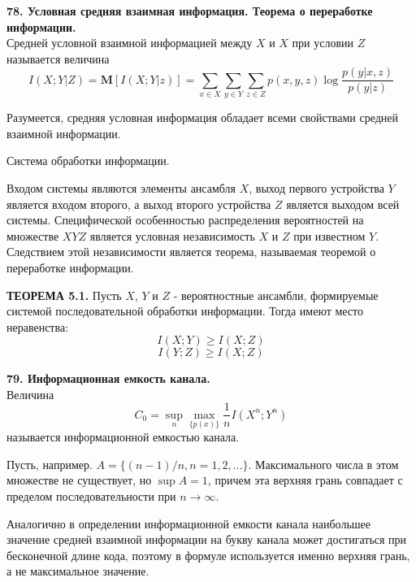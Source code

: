 \documentclass[14pt]{article}
\begin{document}
\bigskip
\textbf{78. Условная средняя взаимная информация. Теорема о переработке информации.} \\

Средней условной взаимной информацией между \(X\) и \(X\) при условии
\(Z\) называется величина
\begin{displaymath}
    I(X;Y|Z) = \textbf{M}[I(X;Y|z)] = \sum_{x \in X}\sum_{y \in Y}\sum_{z \in Z} p(x, y, z) \log\frac{p(y|x, z)}{p(y|z)}
\end{displaymath}

Разумеется, средняя условная информация обладает всеми свойствами средней взаимной информации.

Система обработки информации.

Входом системы являются элементы ансамбля \(X\), выход первого
устройства \(Y\) является входом второго, а выход второго устройства \(Z\)
является выходом всей системы. Специфической особенностью
распределения вероятностей на множестве \(XYZ\) является условная
независимость \(X\) и \(Z\) при известном \(Y\). Следствием этой
независимости является теорема, называемая теоремой о переработке
информации.

\textbf{ТЕОРЕМА 5.1.} Пусть \(X\), \(Y\) и \(Z\) - вероятностные ансамбли, формируемые системой последовательной обработки информации. Тогда имеют место неравенства:
\begin{displaymath}
    I(X;Y) \geq I(X;Z)
\end{displaymath}
\begin{displaymath}
    I(Y;Z) \geq I(X;Z)
\end{displaymath}

\bigskip
\textbf{79. Информационная емкость канала.} \\

Величина 
\begin{displaymath}
    C_0 = \sup_{n}\max_{\{p(x)\}}\frac{1}{n} I(X^n;Y^n)
\end{displaymath}
называется информационной емкостью канала.

Пусть, например. \(A = \{(n - 1)/n, n = 1, 2,...\}\). Максимального числа
в этом множестве не существует, но \(\sup A = 1\), причем эта верхняя грань
совпадает с пределом последовательности при \(n \to \infty\).

Аналогично в определении информационной емкости канала
наибольшее значение средней взаимной информации на букву канала
может достигаться при бесконечной длине кода, поэтому в формуле 
используется именно верхняя грань, а не максимальное значение.
\end{document}
